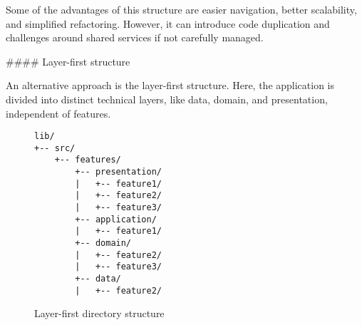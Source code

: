 \documentclass[
  digital,     %
  oneside,     %
  nosansbold,  %
  nocolorbold, %
  lof,         %
  lot,         %
]{fithesis4}
\begin{document}
\begin{markdown}

Some of the advantages of this structure are easier navigation, better scalability, and simplified refactoring.  
However, it can introduce code duplication and challenges around shared services if not carefully managed.

#### Layer-first structure

An alternative approach is the layer-first structure. Here, the application is divided into distinct technical layers, like data, domain, and presentation, independent of features.


\end{markdown}
\begin{figure}[ht]
  \begin{center}
    \begin{minipage}{.8\textwidth}
      \begin{verbatim}
lib/
+-- src/
    +-- features/
        +-- presentation/
        |   +-- feature1/
        |   +-- feature2/
        |   +-- feature3/
        +-- application/
        |   +-- feature1/
        +-- domain/
        |   +-- feature2/
        |   +-- feature3/
        +-- data/
        |   +-- feature2/
      \end{verbatim}
    \end{minipage}
  \end{center}
  \caption{Layer-first directory structure}
  \label{fig:project_directory_layer_first}
\end{figure}
\end{document}
